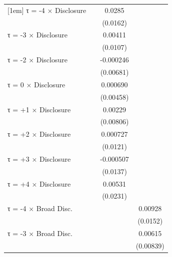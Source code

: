 \begin{table}[htbp]
\begin{tabular}{l*{3}{c}}
[1em]
τ = -4 × Disclosure &                     &      0.0285\sym{*}  &                     \\
                    &                     &    (0.0162)         &                     \\
[1em]
τ = -3 × Disclosure &                     &     0.00411         &                     \\
                    &                     &    (0.0107)         &                     \\
[1em]
τ = -2 × Disclosure &                     &   -0.000246         &                     \\
                    &                     &   (0.00681)         &                     \\
[1em]
τ = 0 × Disclosure  &                     &    0.000690         &                     \\
                    &                     &   (0.00458)         &                     \\
[1em]
τ = +1 × Disclosure &                     &     0.00229         &                     \\
                    &                     &   (0.00806)         &                     \\
[1em]
τ = +2 × Disclosure &                     &    0.000727         &                     \\
                    &                     &    (0.0121)         &                     \\
[1em]
τ = +3 × Disclosure &                     &   -0.000507         &                     \\
                    &                     &    (0.0137)         &                     \\
[1em]
τ = +4 × Disclosure &                     &     0.00531         &                     \\
                    &                     &    (0.0231)         &                     \\
[1em]
τ = -4 × Broad Disc.&                     &                     &     0.00928         \\
                    &                     &                     &    (0.0152)         \\
[1em]
τ = -3 × Broad Disc.&                     &                     &     0.00615         \\
                    &                     &                     &   (0.00839)         \\

\end{tabular}
\end{table}
